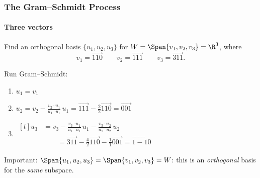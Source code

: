 
\begin{frame}
\frametitle{The Gram--Schmidt Process}
\framesubtitle{Three vectors}

Find an orthogonal basis $\{u_1,u_2,u_3\}$ for $W = \Span\{v_1,v_2,v_3\} = \R^3$, where
\[ v_1 = \vec{1 1 0} \qquad v_2 = \vec{1 1 1} \qquad v_3 = \vec{3 1 1}. \]

\medskip
\begin{webonly}
Run Gram--Schmidt:
\begin{enumerate}
\item $u_1 = v_1$
\item $\displaystyle 
  u_2 = v_2 - \frac{v_2\cdot u_1}{u_1\cdot u_1}\,u_1 
  = \vec{1 1 1} - \frac{2}{2}\vec{1 1 0}
  = \vec{0 0 1}$
\item $\displaystyle\begin{aligned}[t]
    u_3 &= v_3 
    - \frac{v_3\cdot u_1}{u_1\cdot u_1}\,u_1
    - \frac{v_3\cdot u_2}{u_2\cdot u_2}\,u_2 \\
    &\qquad= \vec{3 1 1} 
    - \frac{4}{2}\vec{1 1 0}
    - \frac{1}{1}\vec{0 0 1} = \vec{1 -1 0}
  \end{aligned}$
\end{enumerate}
\end{webonly}

\pause
\alert{Important:} $\Span\{u_1,u_2,u_3\} = \Span\{v_1,v_2,v_3\} = W$: this is an
\emph{orthogonal} basis for the \emph{same} subspace.

\end{frame}



